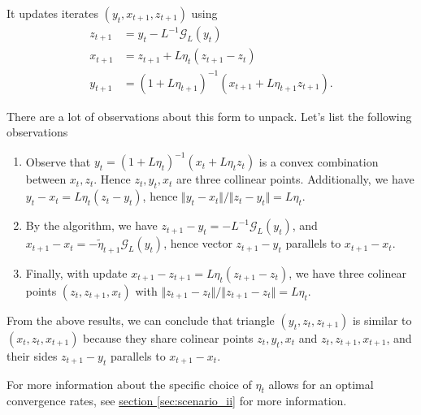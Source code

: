 \documentclass[12pt]{article}
\begin{document}
            \begin{definition}
            \label{def:ag_form_similar_tria_I}
                It updates iterates $(y_t, x_{t + 1}, z_{t + 1})$ using 
                \begin{align*}
                    z_{t + 1} &= y_t - L^{-1} \mathcal G_L(y_t) 
                    \\
                    x_{t + 1} &= z_{t + 1} + L\eta_t (z_{t + 1} - z_t)
                    \\
                    y_{t + 1} &= 
                    (1 + L\eta_{t + 1})^{-1}
                    (x_{t + 1} + L\eta_{t + 1}z_{t + 1}). 
                \end{align*}
            \end{definition}
            \begin{observation}
                There are a lot of observations about this form to unpack. 
                Let's list the following observations
                \begin{enumerate}
                    \item Observe that $y_t = (1 + L\eta_t)^{-1}(x_t + L\eta_t z_t)$ is a convex combination between $x_t, z_t$. Hence $z_t, y_t, x_t$ are three collinear points. Additionally, we have $y_t - x_t = L\eta_t (z_t - y_t)$, hence $\Vert y_t - x_t\Vert/\Vert z_t - y_t\Vert = L\eta_t$. 
                    \item By the algorithm, we have $z_{t + 1} - y_t = - L^{-1} \mathcal G_L(y_t)$, and $x_{t + 1} - x_t = - \tilde \eta_{t + 1} \mathcal G_L(y_t)$, hence vector $z_{t + 1} - y_t$ parallels to $x_{t + 1} - x_t$. 
                    \item Finally, with update $x_{t +1} - z_{t + 1} = L\eta_t (z_{t +1} - z_t)$, we have three colinear points $(z_t, z_{t + 1}, x_t)$ with $\Vert z_{t + 1} - z_t\Vert/\Vert z_{t +1 } - z_t\Vert = L\eta_t$. 
                \end{enumerate}
                From the above results, we can conclude that triangle $(y_t, z_t, z_{t + 1})$ is similar to $(x_t, z_t, x_{t + 1})$ because they share colinear points $z_t, y_t, x_t$ and $z_t, z_{t + 1}, x_{t + 1}$, and their sides $z_{t + 1} - y_t$ parallels to $x_{t + 1} - x_t$. 
            \end{observation}
            \begin{remark}
                For more information about the specific choice of $\eta_t$ allows for an optimal convergence rates, see 
                \hyperref[sec:scenario_ii]{section \ref*{sec:scenario_ii}} for more information. 
            \end{remark}
\end{document}
